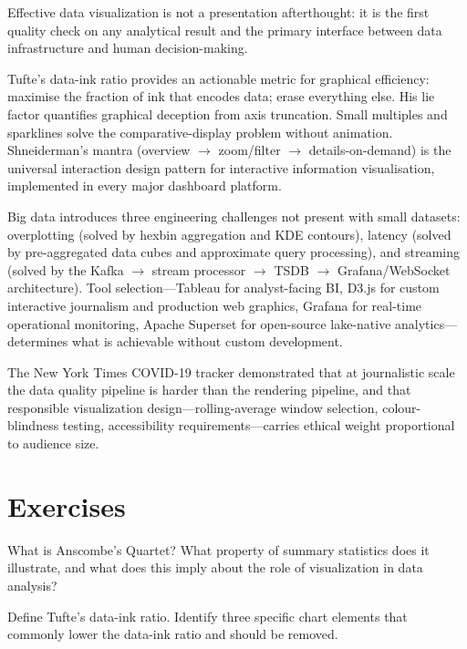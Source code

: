 Effective data visualization is not a presentation afterthought: it is
the first quality check on any analytical result and the primary interface
between data infrastructure and human decision-making.

Tufte's data-ink ratio provides an actionable metric for graphical
efficiency: maximise the fraction of ink that encodes data; erase
everything else. His lie factor quantifies graphical deception from
axis truncation. Small multiples and sparklines solve the
comparative-display problem without animation. Shneiderman's mantra
(overview $\to$ zoom/filter $\to$ details-on-demand) is the universal
interaction design pattern for interactive information visualisation,
implemented in every major dashboard platform.

Big data introduces three engineering challenges not present with small
datasets: overplotting (solved by hexbin aggregation and KDE contours),
latency (solved by pre-aggregated data cubes and approximate query
processing), and streaming (solved by the Kafka $\to$ stream processor
$\to$ TSDB $\to$ Grafana/WebSocket architecture). Tool selection---Tableau
for analyst-facing BI, D3.js for custom interactive journalism and
production web graphics, Grafana for real-time operational monitoring,
Apache Superset for open-source lake-native analytics---determines what
is achievable without custom development.

The New York Times COVID-19 tracker demonstrated that at journalistic
scale the data quality pipeline is harder than the rendering pipeline,
and that responsible visualization design---rolling-average window
selection, colour-blindness testing, accessibility requirements---carries
ethical weight proportional to audience size.

\section*{Exercises}
\label{sec:ch9-exercises}


\sq What is Anscombe's Quartet? What property of summary statistics does
it illustrate, and what does this imply about the role of visualization
in data analysis?

\sq Define Tufte's data-ink ratio. Identify three specific chart elements
that commonly lower the data-ink ratio and should be removed.

